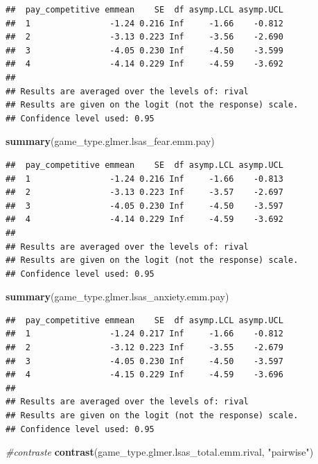 \documentclass[
]{article}
\newenvironment{Shaded}{\begin{snugshade}}{\end{snugshade}}
\newcommand{\CommentTok}[1]{\textcolor[rgb]{0.56,0.35,0.01}{\textit{#1}}}
\newcommand{\FunctionTok}[1]{\textcolor[rgb]{0.13,0.29,0.53}{\textbf{#1}}}
\newcommand{\NormalTok}[1]{#1}
\newcommand{\StringTok}[1]{\textcolor[rgb]{0.31,0.60,0.02}{#1}}
\begin{document}
\begin{verbatim}
##  pay_competitive emmean    SE  df asymp.LCL asymp.UCL
##  1                -1.24 0.216 Inf     -1.66    -0.812
##  2                -3.13 0.223 Inf     -3.56    -2.690
##  3                -4.05 0.230 Inf     -4.50    -3.599
##  4                -4.14 0.229 Inf     -4.59    -3.692
## 
## Results are averaged over the levels of: rival 
## Results are given on the logit (not the response) scale. 
## Confidence level used: 0.95
\end{verbatim}

\begin{Shaded}
\begin{Highlighting}[]
\FunctionTok{summary}\NormalTok{(game\_type.glmer.lsas\_fear.emm.pay)}
\end{Highlighting}
\end{Shaded}

\begin{verbatim}
##  pay_competitive emmean    SE  df asymp.LCL asymp.UCL
##  1                -1.24 0.216 Inf     -1.66    -0.813
##  2                -3.13 0.223 Inf     -3.57    -2.697
##  3                -4.05 0.230 Inf     -4.50    -3.597
##  4                -4.14 0.229 Inf     -4.59    -3.692
## 
## Results are averaged over the levels of: rival 
## Results are given on the logit (not the response) scale. 
## Confidence level used: 0.95
\end{verbatim}

\begin{Shaded}
\begin{Highlighting}[]
\FunctionTok{summary}\NormalTok{(game\_type.glmer.lsas\_anxiety.emm.pay)}
\end{Highlighting}
\end{Shaded}

\begin{verbatim}
##  pay_competitive emmean    SE  df asymp.LCL asymp.UCL
##  1                -1.24 0.217 Inf     -1.66    -0.812
##  2                -3.12 0.223 Inf     -3.55    -2.679
##  3                -4.05 0.230 Inf     -4.50    -3.597
##  4                -4.15 0.229 Inf     -4.59    -3.696
## 
## Results are averaged over the levels of: rival 
## Results are given on the logit (not the response) scale. 
## Confidence level used: 0.95
\end{verbatim}

\begin{Shaded}
\begin{Highlighting}[]
\CommentTok{\#contraste }
\FunctionTok{contrast}\NormalTok{(game\_type.glmer.lsas\_total.emm.rival, }\StringTok{"pairwise"}\NormalTok{)}
\end{Highlighting}
\end{Shaded}
\end{document}
